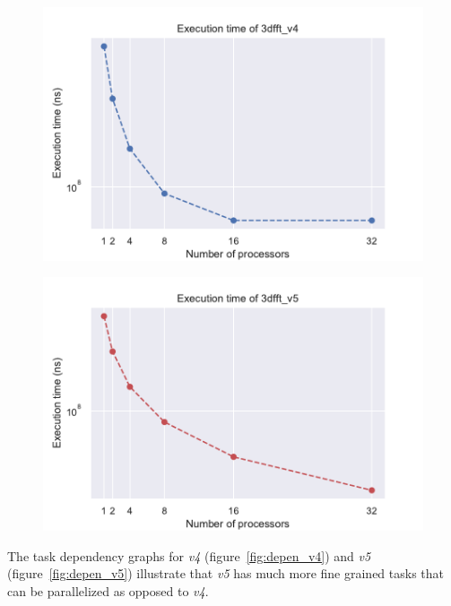 \begin{figure}[H]
\centering
\begin{minipage}{.5\textwidth}
  \centering
  \includegraphics[width=\linewidth]{./data/execution_v4_log.pdf}
  \label{fig:exec_v4_log}
\end{minipage}%
\begin{minipage}{.5\textwidth}
  \centering
  \includegraphics[width=\linewidth]{./data/execution_v5_log.pdf}
  \label{fig:exec_v5_log}
\end{minipage}
\end{figure}

The task dependency graphs for \emph{v4} (figure~\ref{fig:depen_v4}) and \emph{v5} (figure~\ref{fig:depen_v5}) illustrate that \emph{v5} has much more fine grained tasks that can be parallelized as opposed to \emph{v4}.


